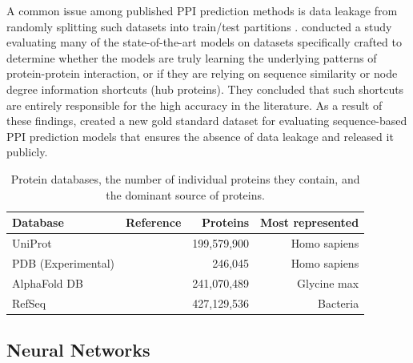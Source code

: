 \documentclass{article}
\begin{document}
A common issue among published PPI prediction methods is data leakage from randomly splitting such datasets into train/test partitions \citep{bernett_cracking_2024}. \citet{bernett_cracking_2024} conducted a study evaluating many of the state-of-the-art models on datasets specifically crafted to determine whether the models are truly learning the underlying patterns of protein-protein interaction, or if they are relying on sequence similarity or node degree information shortcuts (hub proteins). They concluded that such shortcuts are entirely responsible for the high accuracy in the literature. As a result of these findings, \citet{bernett_cracking_2024} created a new gold standard dataset for evaluating sequence-based PPI prediction models that ensures the absence of data leakage and released it publicly.

\begin{table}
  \centering
\caption{Protein databases, the number of individual proteins they contain, and the dominant source of proteins.}
  \label{protein-databases}
  \begin{tabularx}{\textwidth}{l X r r}
    \toprule
    \textbf{Database} & \textbf{Reference} & \textbf{Proteins} & \textbf{Most represented}\\
    \midrule
    UniProt & \citep{consortium_uniprot_2024}  & 199,579,900 & Homo sapiens \\ 
    PDB (Experimental) & \citep{berman_protein_2000}  & 246,045 & Homo sapiens \\ 
    AlphaFold DB & \citep{bertoni_alphafold_2025}  & 241,070,489 & Glycine max \\ 
    RefSeq & \citep{goldfarb_ncbi_2024}  & 427,129,536 & Bacteria \\ 
    \bottomrule
  \end{tabularx}
\end{table}



\subsection{Neural Networks}\label{NNsec}
\end{document}
